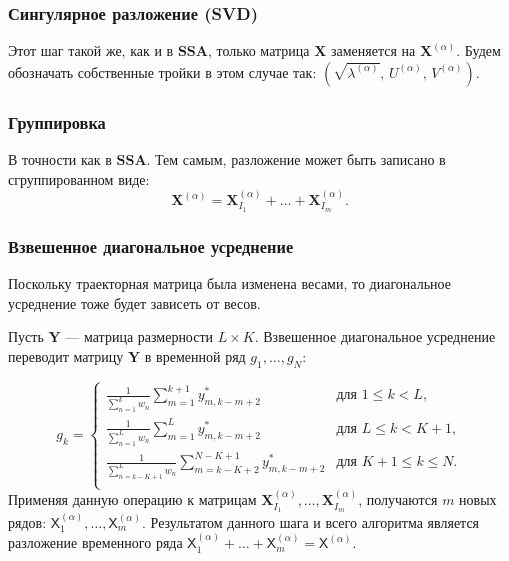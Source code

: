 \documentclass[a4paper, 11pt]{article}
\newcommand{\SSA}{\textbf{SSA}}
\newcommand{\TS}{\mathsf{X}}
\begin{document}
\subsubsection{Сингулярное разложение (SVD)}
Этот шаг такой же, как и в $\SSA$, только матрица $\mathbf{X}$ заменяется на $\mathbf{X}^{(\alpha)}$. Будем обозначать собственные тройки в этом случае так: $(\sqrt{\lambda^{(\alpha)}},\,U^{(\alpha)},\,V^{(\alpha)})$.

\subsubsection{Группировка}
В точности как в $\SSA$. Тем самым, разложение может быть записано в сгруппированном виде:
\begin{equation*}
	\mathbf{X}^{(\alpha)} = \mathbf{X}^{(\alpha)}_{I_1} + \dots + \mathbf{X}^{(\alpha)}_{I_m}.
\end{equation*}

\subsubsection{Взвешенное диагональное усреднение}
Поскольку траекторная матрица была изменена весами, то диагональное усреднение тоже будет зависеть от весов.

Пусть $\mathbf{Y}$ --- матрица размерности $L \times K$. Взвешенное диагональное усреднение переводит матрицу $\mathbf{Y}$ в временной ряд $g_1, \dots, g_{N} $:

\begin{equation*}
	g_{k}=
	\begin{cases}
		\frac{1}{\sum_{n = 1}^k w_n} \sum\limits_{m=1}^{k+1} y_{m,k-m+2}^{*} &
		\text{для } 1 \leq k < L, \\
		
		\frac{1}{\sum_{n = 1}^L w_n} \sum\limits_{m=1}^{L} y_{m,k-m+2}^{*} &
		\text{для } L \leq k < K+1 , \\
		
		\frac{1}{\sum_{n = k-K+1}^L w_n} \sum\limits_{m=k-K+2}^{N-K+1} y_{m,k-m+2}^{*} &
		\text{для } K+1 \leq k \leq N .\\
	\end{cases}
\end{equation*}
Применяя данную операцию к матрицам $\mathbf{X}_{I_1}^{(\alpha)}, \dots, \mathbf{X}_{I_m}^{(\alpha)}$, получаются $m$ новых рядов: $\TS^{(\alpha)}_1, \dots, \TS^{(\alpha)}_m$. 
Результатом данного шага и всего алгоритма является разложение временного ряда $\TS^{(\alpha)}_1 + \dots + \TS^{(\alpha)}_m = \TS^{(\alpha)}$.
\end{document}
